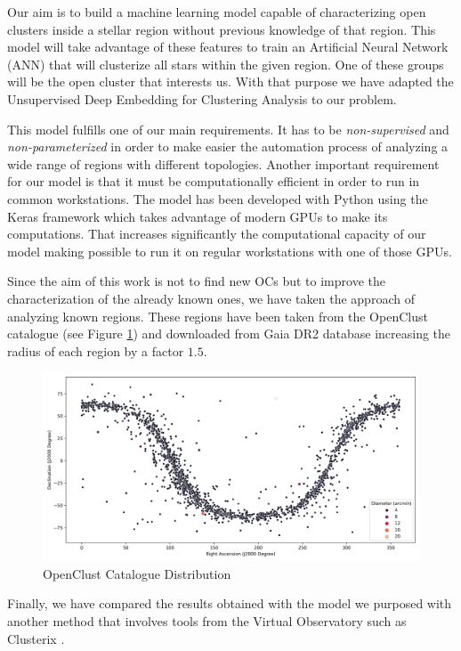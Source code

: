 \documentclass[11pt,a4paper,USenglish,twocolumn]{article}
\begin{document}
Our aim is to build a machine learning model capable of characterizing open
clusters inside a stellar region without previous knowledge of that region.
This model will take advantage of these features to train an Artificial Neural
Network (ANN) that will clusterize all stars within the given region.
One of these groups will be the open cluster that interests us.
With that purpose we have adapted the Unsupervised Deep Embedding for Clustering
Analysis \cite{xie2016unsupervised} to our problem.

This model fulfills one of our main requirements.
It has to be \emph{non-supervised} and \emph{non-parameterized} in order to make easier
the automation process of analyzing a wide range of regions with different topologies.
Another important requirement for our model is that it must be computationally efficient
in order to run in common workstations.
The model has been developed with Python using the Keras framework which takes
advantage of modern GPUs to make its computations.
That increases significantly the computational capacity of our model making possible
to run it on regular workstations with one of those GPUs.

Since the aim of this work is not to find new OCs but to improve the characterization
of the already known ones, we have taken the approach of analyzing known regions.
These regions have been taken from the OpenClust catalogue \cite{dias2002new}
(see Figure \ref{fig:openclust_catalogue}) and downloaded from Gaia DR2 database
increasing the radius of each region by a factor $1.5$.

\begin{figure}
    \includegraphics[width=\columnwidth]{../figures/openclust_catalogue.png}
    \caption{OpenClust Catalogue Distribution}
    \label{fig:openclust_catalogue}
\end{figure}

Finally, we have compared the results obtained with the model we purposed with another
method that involves tools from the Virtual Observatory such as Clusterix \cite{balaguer2020clusterix}.
\end{document}
